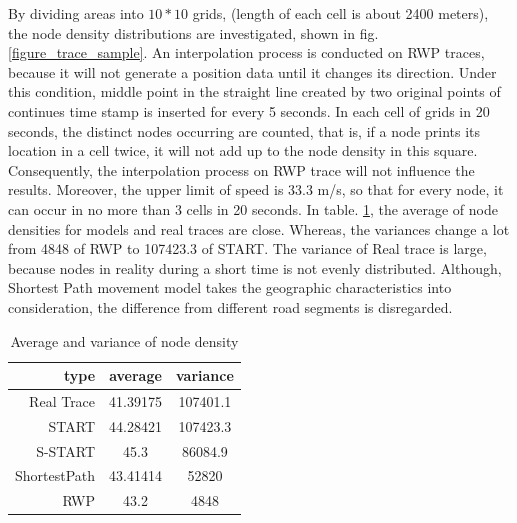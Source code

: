 By dividing areas into $10*10$ grids, (length of each cell is about 2400 meters), the node density distributions are investigated, shown in fig.\ref{figure_trace_sample}. An interpolation process is conducted on RWP traces, because it will not generate a position data until it changes its direction. Under this condition, middle point in the straight line created by two original points of continues time stamp is inserted for every 5 seconds. In each cell of grids in 20 seconds, the distinct nodes occurring are counted, that is, if a node prints its location in a cell twice, it will not add up to the node density in this square. Consequently, the interpolation process on RWP trace will not influence the results. Moreover, the upper limit of speed is 33.3 m/s, so that for every node, it can occur in no more than 3 cells in 20 seconds.  In table. \ref{figure_avg_var_node_density}, the average of node densities for models and real traces are close. Whereas, the variances change a lot from 4848 of RWP to 107423.3 of START. The variance of Real trace is large, because nodes in reality during a short time is not evenly distributed. Although, Shortest Path movement model takes the geographic characteristics into consideration, the difference from different road segments is disregarded.

\begin{table}
\centering
\caption{Average and variance of node density}\label{figure_avg_var_node_density}
\begin{tabular}{r|c|c}
  \hline
 type & average & variance\\
  \hline
  Real Trace & 41.39175 & 107401.1 \\
  START & 44.28421 & 107423.3 \\
  S-START & 45.3 & 86084.9\\
  ShortestPath & 43.41414 & 52820\\
  RWP & 43.2 & 4848 \\
  \hline
\end{tabular}
\end{table}


